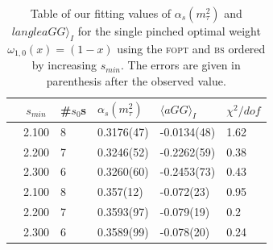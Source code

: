 \documentclass[../../index.tex]{subfiles}
\begin{document}
\begin{table}
  \centering
  \begin{tabularx}{\textwidth}{ccYYYY}
    \toprule
    & \(s_{min}\) & \#\(s_0\)s & \(\alpha_s(m_\tau^2)\) & \(\langle aGG \rangle_I\) & \(\chi^2/dof\)  \\
    \midrule
    \parbox[t]{2mm}{}
    & 2.100 & 8 & 0.3176(47) & -0.0134(48) & 1.62 \\
    & 2.200 & 7 & 0.3246(52) & -0.2262(59) & 0.38 \\
    & 2.300 & 6 & 0.3260(60) & -0.2453(73) & 0.43 \\
    \midrule
    \parbox[t]{2mm}{}
    & 2.100 & 8  & 0.357(12) & -0.072(23) & 0.95 \\
    & 2.200 & 7 &  0.3593(97) & -0.079(19) & 0.2 \\
    & 2.300 & 6 & 0.3589(99) & -0.078(20) & 0.24 \\
    \bottomrule
  \end{tabularx}
  \caption{Table of our fitting values of \(\alpha_s(m_\tau^2)\) and \(langle
    aGG \rangle_I\) for the single pinched optimal weight
    \(\omega_{1,0}(x)=(1-x)\) using the \textsc{fopt} and \textsc{bs} ordered by
    increasing \(s_{min}\). The errors are given in parenthesis after the
    observed value.}
  \label{table:fitOpt10AlD4}
\end{table}
\end{document}
